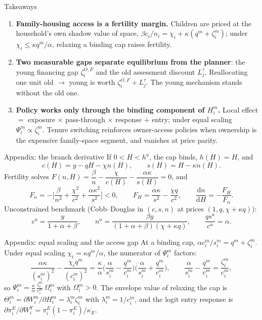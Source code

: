 \documentclass[11pt,aspectratio=169]{beamer}
\newcommand{\dd}{\mathrm d}
\newcommand{\1}{\mathbf 1}
\begin{document}
\begin{frame}{Takeaways}
\begin{enumerate}\setlength{\itemsep}{0.9em}
  \item \textbf{Family-housing access is a fertility margin.} Children are priced at the household's own shadow value of space, $\beta c_i/n_i=\chi_i+\kappa(q^m+\zeta_i^m)$; under $\chi_i\le\kappa q^m/\alpha$, relaxing a binding cap raises fertility.
  \item \textbf{Two measurable gaps separate equilibrium from the planner}: the young financing gap $\zeta_i^{O,F}$ and the old assessment discount $L_j^\tau$. Reallocating one unit old $\to$ young is worth $\zeta_i^{O,F}+L_j^\tau$. The young mechanism stands without the old one.
  \item \textbf{Policy works only through the binding component of $H_i^m$.} Local effect $=$ exposure $\times$ pass-through $\times$ response $+$ entry; under equal scaling $\Psi_i^m\propto\zeta_i^m$. Tenure switching reinforces owner-access policies when ownership is the expensive family-space segment, and vanishes at price parity.
\end{enumerate}
\end{frame}

\appendix

\begin{frame}{Appendix: the branch derivative}
\small
If $0<H<h^u$, the cap binds, $h(H)=H$, and
\[
c(H)=y-qH-\chi n(H),
\qquad
s(H)=H-\kappa n(H).
\]
Fertility solves $F(n,H)=\dfrac{\beta}{n}-\dfrac{\chi}{c(H)}-\dfrac{\alpha\kappa}{s(H)}=0$, and
\[
F_n=-\Big[\frac{\beta}{n^2}+\frac{\chi^2}{c^2}+\frac{\alpha\kappa^2}{s^2}\Big]<0,
\qquad
F_H=\frac{\alpha\kappa}{s^2}-\frac{\chi q}{c^2},
\qquad
\frac{\dd n}{\dd H}=-\frac{F_H}{F_n}.
\]
Unconstrained benchmark (Cobb--Douglas in $(c,s,n)$ at prices $(1,q,\chi+\kappa q)$):
\[
c^u=\frac{y}{1+\alpha+\beta},
\qquad
n^u=\frac{\beta y}{(1+\alpha+\beta)(\chi+\kappa q)},
\qquad
\frac{q s^u}{c^u}=\alpha .
\]
\end{frame}

\begin{frame}{Appendix: equal scaling and the access gap}
\small
At a binding cap, $\alpha c_i^m/s_i^m=q^m+\zeta_i^m$. Under equal scaling $\chi_i=\kappa q^m/\alpha$, the numerator of $\Psi_i^m$ factors:
\[
\frac{\alpha\kappa}{(s_i^m)^2}-\frac{\chi_i q^m}{(c_i^m)^2}
=
\frac{\kappa}{\alpha}
\Big(\frac{\alpha}{s_i^m}-\frac{q^m}{c_i^m}\Big)
\Big(\frac{\alpha}{s_i^m}+\frac{q^m}{c_i^m}\Big),
\qquad
\frac{\alpha}{s_i^m}-\frac{q^m}{c_i^m}=\frac{\zeta_i^m}{c_i^m},
\]
so $\Psi_i^m=\frac{\kappa}{\alpha}\,\frac{\zeta_i^m}{c_i^m}\,\Omega_i^m$ with $\Omega_i^m>0$.
The envelope value of relaxing the cap is $\Theta_i^m=\partial W_i^m/\partial H_i^m=\lambda_i^m\zeta_i^m$ with $\lambda_i^m=1/c_i^m$, and the logit entry response is $\partial\pi_i^E/\partial W_i^Y=\pi_i^E(1-\pi_i^E)/\kappa_E$.
\end{frame}
\end{document}
